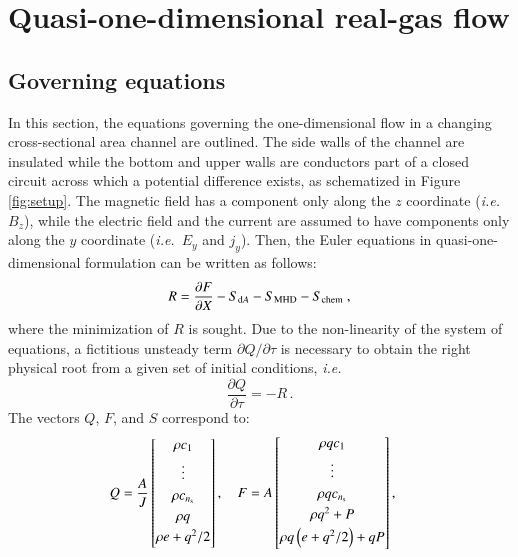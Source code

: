 \documentclass[oneside,10pt,onecolumn]{waflreport}
\newcommand{\ie}{{\it i.e.}}
\newcommand{\pseudot}{\tau}
\newcommand{\ns}{{{n}_{\rm s}}}
\newcommand{\alb}{\vspace{0.1cm}\\} %
\newcommand{\Sda}{S_{{\rm d}A}}
\newcommand{\Schem}{S_{\rm chem}}
\newcommand{\Smhd}{S_{\rm MHD}}
\begin{document}


\section{Quasi-one-dimensional real-gas flow}

\subsection{Governing equations}

In this section, the equations governing the one-dimensional flow in a changing
cross-sectional area channel are outlined. The side walls of the channel are insulated
while the bottom and upper walls are conductors part of a closed circuit across which a
potential difference exists, as schematized in Figure \ref{fig:setup}. The magnetic field
has a component only along the $z$ coordinate (\ie\ $B_z$), while the electric field and the current
are assumed to have components only along the $y$ coordinate (\ie\ $E_y$ and $j_y$).
Then, the Euler equations in quasi-one-dimensional formulation can be written as follows:
%
\begin{equation}
 R=
      \frac{\partial {F}}{\partial X}
     -\Sda-\Smhd-\Schem~,
  \label{eqn:residual}
\end{equation}
%
where the minimization of $R$ is sought.
Due to the non-linearity of the system of equations,
a fictitious unsteady term ${\partial Q}/{\partial \pseudot}$
is necessary to obtain the right physical root from a given set of initial conditions,
\ie
%
\begin{equation}
 \frac{\partial Q}{\partial \pseudot} =-R \, .
\end{equation}
%
The vectors $Q$, $F$, and $S$ correspond to:
%
\begin{equation}
  Q=\frac{A}{J}\left[
      \begin{array}{@{}c@{}}
        {\rho}{c_1} \alb
        \vdots \alb
        {\rho}{c_\ns} \alb
        {\rho}{q} \alb
        {\rho}e+q^2/2 \alb
      \end{array}
    \right],~~~~
  F
   =A
     \left[
      \begin{array}{@{}c@{}}
        {\rho} q{c_1} \alb
        \vdots \alb
        {\rho} q{c_\ns} \alb
        {\rho} q^2 +  P\alb
        {\rho} q \left(e+q^2/2\right)+ q P \alb
      \end{array}
    \right],~~~~
  \label{eqn:S}
\end{equation}
\end{document}
